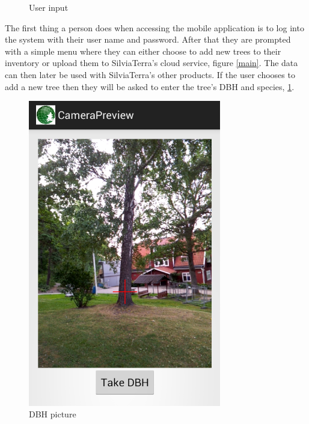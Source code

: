\begin{figure}[!htb]
	  	\caption{User input}
  		\label{input}
	\endminipage\hfill
\end{figure}
The first thing a person does when accessing the mobile application is to log into the system with their user name and password. After that they are prompted with a simple menu where they can either choose to add new trees to their inventory or upload them to SilviaTerra's cloud service, figure \ref{main}. The data can then later be used with SilviaTerra's other products. If the user chooses to add a new tree then they will be asked to enter the tree's DBH and species, \ref{input}. 
\begin{figure}[!htb]
		\centering
  		\includegraphics[width=0.75\textwidth]{dbh.png}
	  	\caption{DBH picture}
	  	\label{dbh}
	\endminipage\hfill
		\centering

\end{figure}
